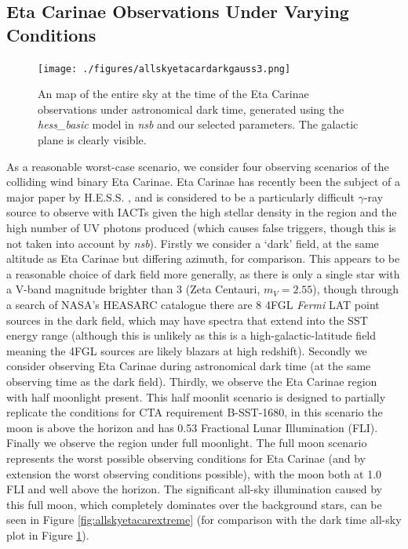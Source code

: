 \subsection{Eta Carinae Observations Under Varying Conditions}
\label{sec:etacarvary}
\begin{figure}[t!]
\begin{centering}
\texttt{[image: ./figures/allskyetacardarkgauss3.png]}
\caption{An map of the entire sky at the time of the Eta Carinae observations under astronomical dark time, generated using the \textit{hess\_basic} model in \textit{nsb} and our selected parameters. The galactic plane is clearly visible.}
\label{fig:allskyetacardarkgauss3}
\end{centering}
\end{figure}
As a reasonable worst-case scenario, we consider four observing scenarios of the colliding wind binary Eta Carinae. Eta Carinae has recently been the subject of a major paper by H.E.S.S. \cite{hessetacar}, and  is considered to be a particularly difficult $\gamma$-ray source to observe with IACTs given the high stellar density in the region and the high number of UV photons produced (which causes false triggers, though this is not taken into account by \textit{nsb}). Firstly we consider a `dark' field, at the same altitude as Eta Carinae but differing azimuth, for comparison. This appears to be a reasonable choice of dark field more generally, as there is only a single star with a V-band magnitude brighter than 3 (Zeta Centauri, $m_V=2.55$), though through a search of NASA's HEASARC catalogue there are 8 4FGL \textit{Fermi} LAT point sources in the dark field, which may have spectra that extend into the SST energy range (although this is unlikely as this is a high-galactic-latitude field meaning the 4FGL sources are likely blazars at high redshift). Secondly we consider observing Eta Carinae during astronomical dark time (at the same observing time as the dark field). Thirdly, we observe the Eta Carinae region with half moonlight present. This half moonlit scenario is designed to partially replicate the conditions for CTA requirement B-SST-1680, in this scenario the moon is above the horizon and has 0.53 Fractional Lunar Illumination (FLI). Finally we observe the region under full moonlight. The full moon scenario represents the worst possible observing conditions for Eta Carinae (and by extension the worst observing conditions possible), with the moon both at 1.0 FLI and well above the horizon. The significant all-sky illumination caused by this full moon, which completely dominates over the background stars, can be seen in Figure \ref{fig:allskyetacarextreme} (for comparison with the dark time all-sky plot in Figure \ref{fig:allskyetacardarkgauss3}).

